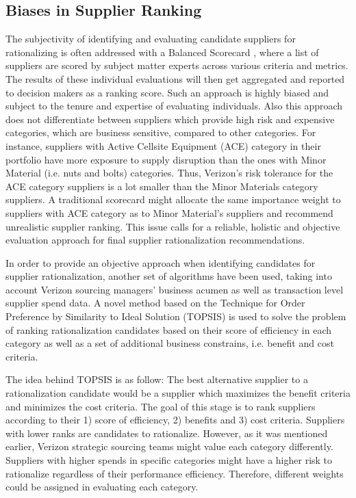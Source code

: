 \documentclass[inte,nonblindrev]{informs3} %
\begin{document}
\subsection{Biases in Supplier Ranking}
The subjectivity of identifying and evaluating candidate suppliers for rationalizing is often addressed with a Balanced Scorecard \citep{r7}, where a list of suppliers are scored by subject matter experts across various criteria and metrics. The results of these individual evaluations will then get aggregated and reported to decision makers as a ranking score. Such an approach is highly biased and subject to the tenure and expertise of evaluating individuals. Also this approach does not differentiate between suppliers which provide high risk and expensive categories, which are business sensitive, compared to other categories. For instance, suppliers with Active Cellsite Equipment (ACE) category in their portfolio have more exposure to supply disruption than the ones with Minor Material (i.e. nuts and bolts) categories. Thus, Verizon's risk tolerance for the ACE category suppliers is a lot smaller than the Minor Materials category suppliers. A traditional scorecard might allocate the same importance weight to suppliers with ACE category as to Minor Material's suppliers and recommend unrealistic supplier ranking. This issue calls for a reliable, holistic and objective evaluation approach for final supplier rationalization recommendations.

In order to provide an objective approach when identifying candidates for supplier rationalization, another set of algorithms have been used, taking into account Verizon sourcing managers' business acumen as well as transaction level supplier spend data. A novel method based on the Technique for Order Preference by Similarity to Ideal Solution (TOPSIS) \citep{r4} is used to solve the problem of ranking rationalization candidates based on their score of efficiency in each category as well as a set of additional business constrains, i.e. benefit and cost criteria. 

The idea behind TOPSIS is as follow: The best alternative supplier to a rationalization candidate would be a supplier which maximizes the benefit criteria and minimizes the cost criteria. The goal of this stage is to rank suppliers according to their 1) score of efficiency, 2) benefits and 3) cost criteria. Suppliers with lower ranks are candidates to rationalize. However, as it was mentioned earlier, Verizon strategic sourcing teams might value each category differently. Suppliers with higher spends in specific categories might have a higher risk to rationalize regardless of their performance efficiency. Therefore, different weights could be assigned in evaluating each category.
\end{document}

